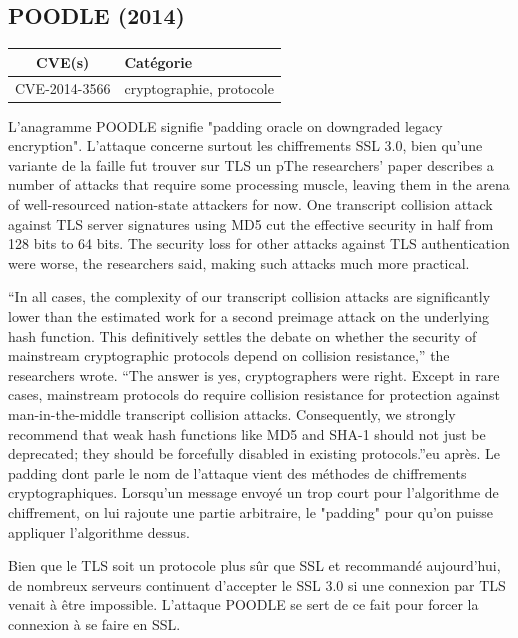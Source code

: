 \subsection{POODLE (2014)}

\begin{tabularx}{0.96\textwidth}{|c|X|}
  \hline
  \textbf{CVE(s)} & \textbf{Catégorie} \\
  \hline
  CVE-2014-3566 & cryptographie, protocole \\
  \hline
\end{tabularx}

\vspace{1em}

L'anagramme POODLE signifie "padding oracle on downgraded legacy encryption". L'attaque concerne surtout les chiffrements SSL 3.0, bien qu'une variante de la faille fut trouver sur TLS un pThe researchers’ paper describes a number of attacks that require some processing muscle, leaving them in the arena of well-resourced nation-state attackers for now. One transcript collision attack against TLS server signatures using MD5 cut the effective security in half from 128 bits to 64 bits. The security loss for other attacks against TLS authentication were worse, the researchers said, making such attacks much more practical.

“In all cases, the complexity of our transcript collision attacks are significantly lower than the estimated work for a second preimage attack on the underlying hash function. This definitively settles the debate on whether the security of mainstream cryptographic protocols depend on collision resistance,” the researchers wrote. “The answer is yes, cryptographers were right. Except in rare cases, mainstream protocols do require collision resistance for protection against man-in-the-middle transcript collision attacks. Consequently, we strongly recommend that weak hash functions like MD5 and SHA-1 should not just be deprecated; they should be forcefully disabled in existing protocols.”eu après.
Le padding dont parle le nom de l'attaque vient des méthodes de chiffrements cryptographiques. Lorsqu'un message envoyé un trop court pour l'algorithme de chiffrement, on lui rajoute une partie arbitraire, le "padding" pour qu'on puisse appliquer l'algorithme dessus.

Bien que le TLS soit un protocole plus sûr que SSL et recommandé aujourd'hui, de nombreux serveurs continuent d'accepter le SSL 3.0 si une connexion par TLS venait à être impossible. L'attaque POODLE se sert de ce fait pour forcer la connexion à se faire en SSL.

